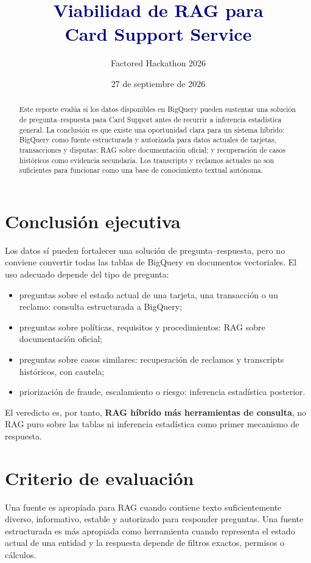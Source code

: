 \documentclass[11pt,a4paper]{article}
\title{\textcolor{navy}{Viabilidad de RAG para\\[2pt] Card Support Service}}
\author{Factored Hackathon 2026}
\date{27 de septiembre de 2026}
\begin{document}
\maketitle

\begin{abstract}
Este reporte evalúa si los datos disponibles en BigQuery pueden sustentar una solución de pregunta--respuesta para Card Support antes de recurrir a inferencia estadística general. La conclusión es que existe una oportunidad clara para un sistema híbrido: BigQuery como fuente estructurada y autorizada para datos actuales de tarjetas, transacciones y disputas; RAG sobre documentación oficial; y recuperación de casos históricos como evidencia secundaria. Los transcripts y reclamos actuales no son suficientes para funcionar como una base de conocimiento textual autónoma.
\end{abstract}

\section{Conclusión ejecutiva}

Los datos sí pueden fortalecer una solución de pregunta--respuesta, pero no conviene convertir todas las tablas de BigQuery en documentos vectoriales. El uso adecuado depende del tipo de pregunta:

\begin{itemize}
  \item preguntas sobre el estado actual de una tarjeta, una transacción o un reclamo: consulta estructurada a BigQuery;
  \item preguntas sobre políticas, requisitos y procedimientos: RAG sobre documentación oficial;
  \item preguntas sobre casos similares: recuperación de reclamos y transcripts históricos, con cautela;
  \item priorización de fraude, escalamiento o riesgo: inferencia estadística posterior.
\end{itemize}

El veredicto es, por tanto, \textbf{RAG híbrido más herramientas de consulta}, no RAG puro sobre las tablas ni inferencia estadística como primer mecanismo de respuesta.

\section{Criterio de evaluación}

Una fuente es apropiada para RAG cuando contiene texto suficientemente diverso, informativo, estable y autorizado para responder preguntas. Una fuente estructurada es más apropiada como herramienta cuando representa el estado actual de una entidad y la respuesta depende de filtros exactos, permisos o cálculos.
\end{document}
